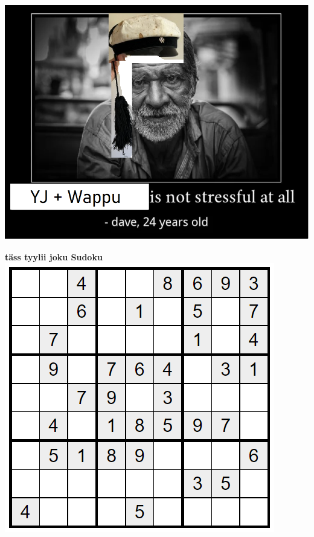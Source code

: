 \documentclass[10pt, a4paper]{article}
\begin{document}
\begin{multicols}{2}
\begin{flushleft}
\includegraphics[scale=0.42]{kuvat/yj-wappu.png}

\pagebreak

\end{flushleft}
\end{multicols}


\begin{center}
\pagebreak
\vspace*{1cm}


\vspace{1cm}

\vspace{1.3cm}

\newpage
\vspace*{2cm}

\textbf{\sc\Huge täss tyylii joku Sudoku}
\hspace*{-2cm}\includegraphics[scale=1.7]{kuvat/sudoku.png}

\end{center}
\end{document}
